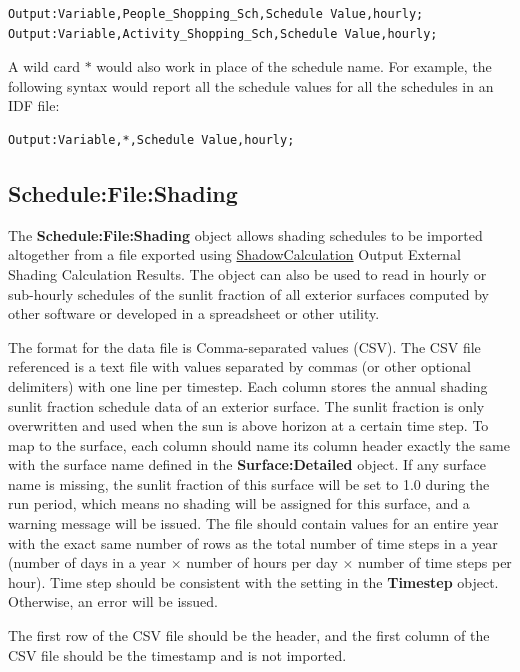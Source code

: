 \begin{lstlisting}
Output:Variable,People_Shopping_Sch,Schedule Value,hourly;
Output:Variable,Activity_Shopping_Sch,Schedule Value,hourly;
\end{lstlisting}

A wild card $*$ would also work in place of the schedule name. For example, the following syntax would report all the schedule values for all the schedules in an IDF file:
\begin{lstlisting}
Output:Variable,*,Schedule Value,hourly;
\end{lstlisting}

\subsection{Schedule:File:Shading}\label{schedulefileshading}

The \textbf{Schedule:File:Shading} object allows shading schedules to be imported altogether from a file exported using \hyperref[shadowcalculation]{ShadowCalculation} Output External Shading Calculation Results. The object can also be used to read in hourly or sub-hourly schedules of the sunlit fraction of all exterior surfaces computed by other software or developed in a spreadsheet or other utility.

The format for the data file is Comma-separated values (CSV). The CSV file referenced is a text file with values separated by commas (or other optional delimiters) with one line per timestep. Each column stores the annual shading sunlit fraction schedule data of an exterior surface. The sunlit fraction is only overwritten and used when the sun is above horizon at a certain time step. To map to the surface, each column should name its column header exactly the same with the surface name defined in the \textbf{Surface:Detailed} object. If any surface name is missing, the sunlit fraction of this surface will be set to 1.0 during the run period, which means no shading will be assigned for this surface, and a warning message will be issued. The file should contain values for an entire year with the exact same number of rows as the total number of time steps in a year (number of days in a year $\times$ number of hours per day $\times$ number of time steps per hour). Time step should be consistent with the setting in the \textbf{Timestep} object. Otherwise, an error will be issued.

The first row of the CSV file should be the header, and the first column of the CSV file should be the timestamp and is not imported.

